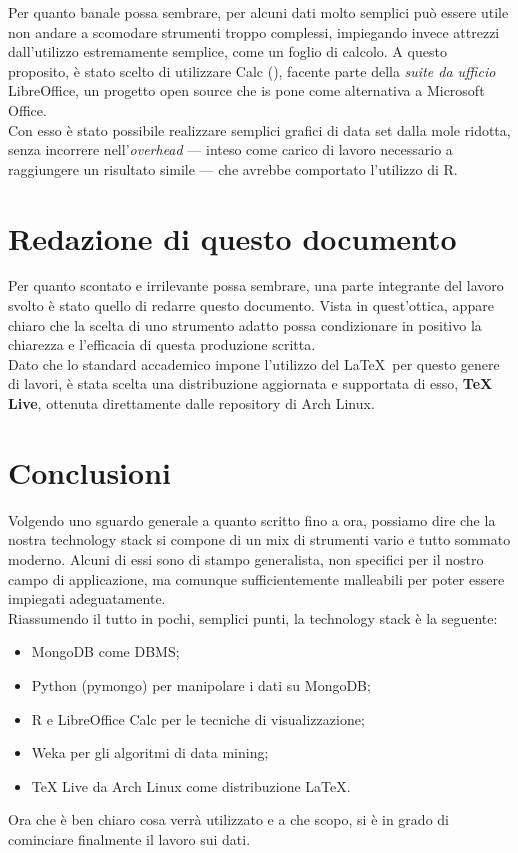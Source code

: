     Per quanto banale possa sembrare, per alcuni dati molto semplici può essere utile non andare a scomodare strumenti troppo complessi, impiegando invece attrezzi dall'utilizzo estremamente semplice, come un foglio di calcolo. A questo proposito, è stato scelto di utilizzare Calc (\cite{calc}), facente parte della \textit{suite da ufficio} LibreOffice, un progetto open source che is pone come alternativa a Microsoft Office. \\

    Con esso è stato possibile realizzare semplici grafici di data set dalla mole ridotta, senza incorrere nell'\textit{overhead} --- inteso come carico di lavoro necessario a raggiungere un risultato simile --- che avrebbe comportato l'utilizzo di R.

\section{Redazione di questo documento}

    Per quanto scontato e irrilevante possa sembrare, una parte integrante del lavoro svolto è stato quello di redarre questo documento. Vista in quest'ottica, appare chiaro che la scelta di uno strumento adatto possa condizionare in positivo la chiarezza e l'efficacia di questa produzione scritta. \\

    Dato che lo standard accademico impone l'utilizzo del \LaTeX\ per questo genere di lavori, è stata scelta una distribuzione aggiornata e supportata di esso, \textbf{TeX Live}, ottenuta direttamente dalle repository di Arch Linux.

\section{Conclusioni}

    Volgendo uno sguardo generale a quanto scritto fino a ora, possiamo dire che la nostra technology stack si compone di un mix di strumenti vario e tutto sommato moderno. Alcuni di essi sono di stampo generalista, non specifici per il nostro campo di applicazione, ma comunque sufficientemente malleabili per poter essere impiegati adeguatamente. \\

    Riassumendo il tutto in pochi, semplici punti, la technology stack è la seguente:

    \begin{itemize}
        \item MongoDB come DBMS;
        \item Python (pymongo) per manipolare i dati su MongoDB;
        \item R e LibreOffice Calc per le tecniche di visualizzazione;
        \item Weka per gli algoritmi di data mining;
        \item TeX Live da Arch Linux come distribuzione \LaTeX.
    \end{itemize}

    Ora che è ben chiaro cosa verrà utilizzato e a che scopo, si è in grado di cominciare finalmente il lavoro sui dati.
